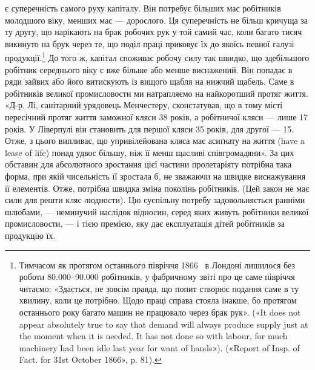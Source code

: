 \parcont{}  %
є суперечність самого руху капіталу. Він потребує більших мас робітників молодшого віку, менших мас
— дорослого. Ця суперечність не більш кричуща за ту другу, що нарікають на брак робочих рук у той
самий час, коли багато тисяч викинуто на
брук через те, що поділ праці приковує їх до якоїсь певної галузі продукції.\footnote{
Тимчасом як протягом останнього півріччя 1866~ в Лондоні лишилося без роботи \num{80.000}--\num{90.000}
робітників, у фабричному звіті про це саме півріччя читаємо: «Здається, не зовсім правда, що попит
створює подання саме в ту хвилину, коли це потрібно. Щодо праці справа стояла інакше, бо протягом
останнього року багато машин не працювало через брак рук». («It does not appear absolutely true to
say that demand
will always produce supply just at the moment when it is needed. It has not done so with labour, for
much machinery had been idle last year for want of hands»). («Report of Insp. of Fact. for 31st
October 1866», p. 81).
} До того ж, капітал
споживає робочу силу так швидко, що здебільшого робітник середнього віку є вже більше або менше
виснажений. Він попадає в ряди зайвих або його витискують
із вищого щабля на нижчий щабель. Саме в робітників великої промисловости ми натрапляємо на
найкоротший протяг життя. «Д-р. Лі, санітарний урядовець Менчестеру, сконстатував, що в тому місті
пересічний протяг життя заможної кляси
38 років, а робітничої кляси — лише 17 років. У Ліверпулі він становить для першої кляси 35 років,
для другої — 15. Отже, з цього випливає, що упривілейована кляса має асиґнату на життя (have a lease
of life) понад удвоє більшу, ніж її менш щасливі співгромадяни». За цих обставин для абсолютного
зростання цієї частини пролетаріяту потрібна така форма, при якій чисельність її зростала б, не
зважаючи на швидке виснажування її елементів. Отже, потрібна швидка зміна поколінь робітників.
(Цей закон не має сили для решти кляс людности).
Цю суспільну потребу задовольняється ранніми шлюбами, — неминучий наслідок відносин, серед яких
живуть робітники великої промисловости, — і тією премією, яку дає експлуатація дітей робітників за
продукцію їх.

